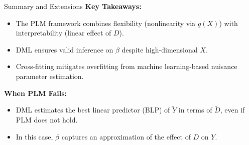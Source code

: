 \documentclass[xcolor=svgnames,t]{beamer}
\begin{document}
               
                                
                \begin{frame}{Summary and Extensions}
                    \textbf{Key Takeaways:}
                    \begin{itemize}
                        \item The PLM framework combines flexibility (nonlinearity via \(g(X)\)) with interpretability (linear effect of \(D\)).
                        \item DML ensures valid inference on \(\beta\) despite high-dimensional \(X\).
                        \item Cross-fitting mitigates overfitting from machine learning-based nuisance parameter estimation.
                    \end{itemize}
                    
                    \pause
                    
                    \textbf{When PLM Fails:}
                    \begin{itemize}
                        \item DML estimates the best linear predictor (BLP) of \(\tilde{Y}\) in terms of \(\tilde{D}\), even if PLM does not hold.
                        \item In this case, \(\beta\) captures an approximation of the effect of \(D\) on \(Y\).
                    \end{itemize}
                    \end{frame} 
\end{document}
